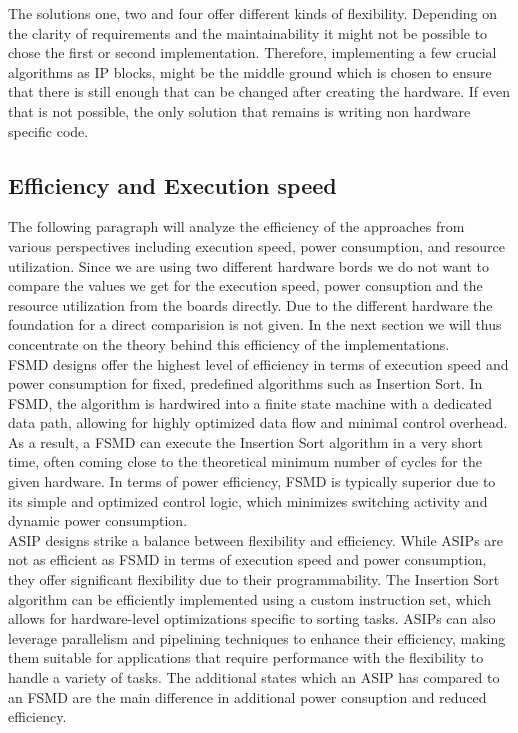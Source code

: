 \documentclass[conference]{IEEEtran}
\begin{document}
The solutions one, two and four offer different kinds of flexibility. Depending on the clarity of requirements and the maintainability it might not be possible to chose the first or second implementation. Therefore, implementing a few crucial algorithms as IP blocks, might be the middle ground which is chosen to ensure that there is still enough that can be changed after creating the hardware. If even that is not possible, the only solution that remains is writing non hardware specific code.

\subsection{Efficiency and Execution speed}
The following paragraph will analyze the efficiency of the approaches from various perspectives including execution speed, power consumption, and resource utilization. Since we are using two different hardware bords we do not want to compare the values we get for the execution speed, power consuption and the resource utilization from the boards directly. Due to the different hardware the foundation for a direct comparision is not given. In the next section we will thus concentrate on the theory behind this efficiency of the implementations.\\
FSMD designs offer the highest level of efficiency in terms of execution speed and power consumption for fixed, predefined algorithms such as Insertion Sort. In FSMD, the algorithm is hardwired into a finite state machine with a dedicated data path, allowing for highly optimized data flow and minimal control overhead. As a result, a FSMD can execute the Insertion Sort algorithm in a very short time, often coming close to the theoretical minimum number of cycles for the given hardware. In terms of power efficiency, FSMD is typically superior due to its simple and optimized control logic, which minimizes switching activity and dynamic power consumption.\\
ASIP designs strike a balance between flexibility and efficiency. While ASIPs are not as efficient as FSMD in terms of execution speed and power consumption, they offer significant flexibility due to their programmability. The Insertion Sort algorithm can be efficiently implemented using a custom instruction set, which allows for hardware-level optimizations specific to sorting tasks. ASIPs can also leverage parallelism and pipelining techniques to enhance their efficiency, making them suitable for applications that require performance with the flexibility to handle a variety of tasks. The additional states which an ASIP has compared to an FSMD are the main difference in additional power consuption and reduced efficiency.\\
\end{document}
